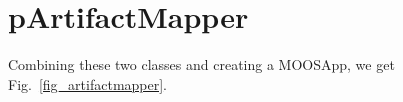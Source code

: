 \section{pArtifactMapper}
\label{pArtifactMapper}

Combining these two classes and creating a MOOSApp, we get Fig.~\ref{fig_artifactmapper}.

